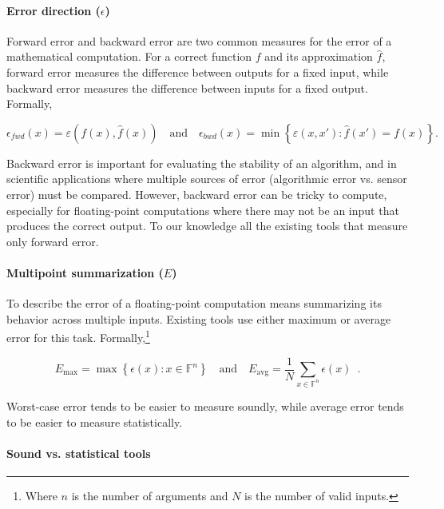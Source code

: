 \documentclass[main.tex]{subfiles}
\begin{document}
\paragraph{Error direction ($\epsilon$)}

Forward error and backward error are two common measures
  for the error of a mathematical computation.
For a correct function $f$ and its approximation $\hat f$,
  forward error measures the difference between outputs for a fixed input,
  while backward error measures the difference between inputs
  for a fixed output.
Formally,

\begin{equation*}
  \epsilon_{fwd}(x) = \varepsilon(f(x), \hat{f}(x))
  \quad \text{and} \quad
  \epsilon_{bwd}(x) =
  \min \left\{ \varepsilon(x, x') : {\hat f}(x') = f(x) \right\}.
\end{equation*}

Backward error is important for evaluating the stability of an algorithm,
  and in scientific applications where multiple sources of error
  (algorithmic error vs. sensor error) must be compared.
However, backward error can be tricky to compute,
  especially for floating-point computations
  where there may not be an input that produces the correct output.
To our knowledge all the existing tools that measure only forward error.

\paragraph{Multipoint summarization ($E$)}

To describe the error of a floating-point computation
  means summarizing its behavior across multiple inputs.
Existing tools use either maximum or average error for this task.
Formally,\footnote{Where $n$ is the number of arguments and $N$ is the number of valid inputs.}

\begin{equation*}
  E_{\text{max}} = \max \left\{\epsilon(x) : x \in \mathbb{F}^n\right\}
  \quad \text{and} \quad
  E_{\text{avg}} = \frac{1}{N} \sum_{x\in \mathbb{F}^n} \epsilon(x) \enspace .
\end{equation*}

Worst-case error tends to be easier to measure soundly,
  while average error tends to be easier to measure statistically.

\paragraph{Sound vs. statistical tools}
\end{document}
